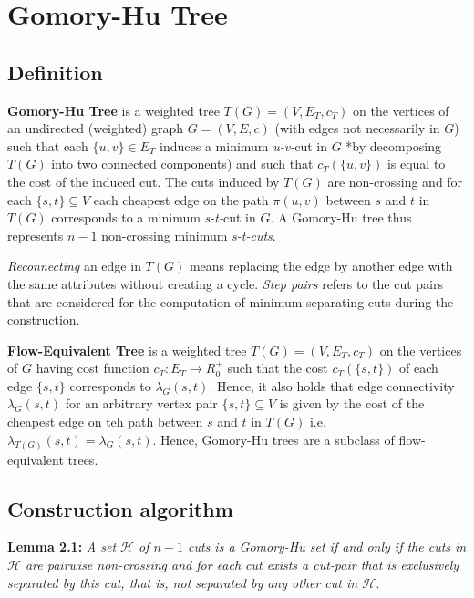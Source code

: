 \chapter{Gomory-Hu Tree}
    \section{Definition}

    {\large \bf Gomory-Hu Tree} is a weighted tree $T(G) = (V,E_T,c_T)$ on the vertices of an undirected (weighted) graph $G = (V,E,c)$ (with edges not necessarily in $G$) such that each $\{u,v\}\in E_T$ induces a minimum \textit{u-v-}cut in $G$ *by decomposing $T(G)$ into two connected components) and such that $c_T(\{u,v\})$ is equal to the cost of the induced cut. The cuts induced by $T(G)$ are non-crossing and for each $\{s,t\} \subseteq V$ each cheapest edge on the path $\pi (u,v)$ between $s$ and $t$ in $T(G)$ corresponds to a minimum \textit{s-t-}cut in $G$. A Gomory-Hu tree thus represents $n-1$ non-crossing minimum \textit{s-t-cuts}.
    
    \textit{Reconnecting} an edge in $T(G)$ means replacing the edge by another edge with the same attributes without creating a cycle. \textit{Step pairs} refers to the cut pairs that are considered for the computation of minimum separating cuts during the construction.

    \vspace{5mm}
    {\large \bf Flow-Equivalent Tree} is a weighted tree $T(G) = (V,E_T,c_T)$ on the vertices of $G$ having cost function $c_T:E_T\xrightarrow{}R_0^{+}$ such that the cost $c_T(\{s,t\})$ of each edge $\{s,t\}$ corresponds to $\lambda_G (s,t)$. Hence, it also holds that edge connectivity $\lambda_G (s,t)$ for an arbitrary vertex pair $\{s,t\}\subseteq V$ is given by the cost of the cheapest edge on teh path between $s$ and $t$ in $T(G)$ i.e. $\lambda_{T(G)} (s,t) = \lambda_G (s,t)$. Hence, Gomory-Hu trees are a subclass of flow-equivalent trees.

    \section{Construction algorithm}

    {\large \bf Lemma 2.1:} \textit{A set $\mathcal{H}$ of $n-1$ cuts is a Gomory-Hu set if and only if the cuts in $\mathcal{H}$ are pairwise non-crossing and for each cut exists a cut-pair that is exclusively separated by this cut, that is, not separated by any other cut in $\mathcal{H}$.}
    
